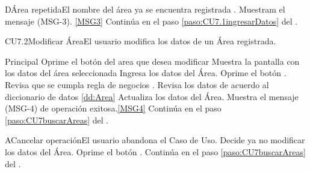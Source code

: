 	\begin{UCtrayectoriaA}{D}{Área repetida}{El nombre del área ya se encuentra registrada .}
		\UCpaso Muestram el mensaje (MSG-3). \ref{MSG3}
		\UCpaso Continúa en el paso \ref{paso:CU7.1ingresarDatos} del .
	\end{UCtrayectoriaA}

	\begin{UseCase}{CU7.2}{Modificar Área}{El usuario modifica los datos de un Área registrada.}
			\end{UseCase}

	\begin{UCtrayectoria}{Principal}
			\UCpaso[\UCactor] Oprime el botón  del area que desea modificar 	\UCpaso Muestra la pantalla  con los datos del área seleccionada 
			\UCpaso [\UCactor] Ingresa los datos del Área.\label{paso:CU7.2ingresarDatos}
			\UCpaso [\UCactor] Oprime el botón .
			\UCpaso Revisa que se cumpla regla de negocios . 
			\UCpaso Revisa los datos de acuerdo al diccionario de datos \ref{dd:Area} 
			\UCpaso Actualiza los datos del Área.
			\UCpaso Muestra el mensaje (MSG-4) de operación exitosa.\ref{MSG4}
			\UCpaso Continúa en el paso \ref{paso:CU7buscarAreas} del .
	\end{UCtrayectoria}
	\newpage
		\begin{UCtrayectoriaA}{A}{Cancelar operación}{El usuario abandona el Caso de Uso.}
			\UCpaso[\UCactor] Decide ya no modificar los datos del Área.
			\UCpaso[\UCactor] Oprime el botón .
			\UCpaso Continúa en el paso \ref{paso:CU7buscarAreas} del .
		\end{UCtrayectoriaA}
		
